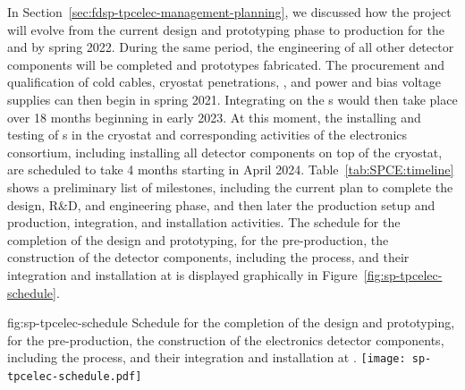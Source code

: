 In Section~\ref{sec:fdsp-tpcelec-management-planning}, we  
discussed how the project will evolve from the current design
and prototyping phase to production for the 
and  by spring 2022. During the same  
period, the engineering of all other detector components will
be completed and prototypes fabricated. The procurement
and qualification of cold cables, cryostat penetrations, ,
and power and bias voltage supplies can then begin in spring 2021.
Integrating  on the s would then
take place over 18 months beginning in early 2023. At
this moment, the installing and testing of s in 
the cryostat and corresponding activities of the  electronics consortium, including installing all 
detector components on top of the cryostat, are scheduled to
take 4 months starting in April 2024. Table~\ref{tab:SPCE:timeline} shows a preliminary list of 
milestones, including the current plan to complete  
the design, R\&D, and engineering phase, and then later  
the production setup and production, integration,
and installation activities. The schedule for the 
completion of the design and prototyping, for the pre-production,
the construction of the detector components, including the
 process, and their integration and installation at
 is displayed graphically in Figure~\ref{fig:sp-tpcelec-schedule}.


\begin{dunefigure}
{fig:sp-tpcelec-schedule}
{Schedule for the completion of the design and prototyping, for the pre-production,
the construction of the  electronics detector components, including the
 process, and their integration and installation at .}
\texttt{[image: sp-tpcelec-schedule.pdf]}
\end{dunefigure}


